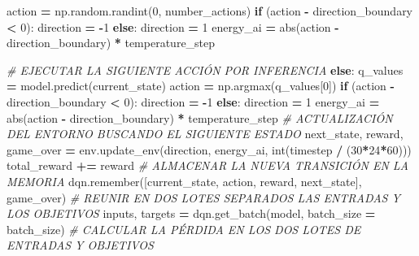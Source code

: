 \documentclass[
]{book}
\newenvironment{Shaded}{\begin{snugshade}}{\end{snugshade}}
\newcommand{\BuiltInTok}[1]{#1}
\newcommand{\CommentTok}[1]{\textcolor[rgb]{0.56,0.35,0.01}{\textit{#1}}}
\newcommand{\ControlFlowTok}[1]{\textcolor[rgb]{0.13,0.29,0.53}{\textbf{#1}}}
\newcommand{\DecValTok}[1]{\textcolor[rgb]{0.00,0.00,0.81}{#1}}
\newcommand{\NormalTok}[1]{#1}
\newcommand{\OperatorTok}[1]{\textcolor[rgb]{0.81,0.36,0.00}{\textbf{#1}}}
\begin{document}
\begin{Shaded}
\begin{Highlighting}[]
\NormalTok{                action }\OperatorTok{=}\NormalTok{ np.random.randint(}\DecValTok{0}\NormalTok{, number\_actions)}
                \ControlFlowTok{if}\NormalTok{ (action }\OperatorTok{{-}}\NormalTok{ direction\_boundary }\OperatorTok{\textless{}} \DecValTok{0}\NormalTok{):}
\NormalTok{                    direction }\OperatorTok{=} \OperatorTok{{-}}\DecValTok{1}
                \ControlFlowTok{else}\NormalTok{:}
\NormalTok{                    direction }\OperatorTok{=} \DecValTok{1}
\NormalTok{                energy\_ai }\OperatorTok{=} \BuiltInTok{abs}\NormalTok{(action }\OperatorTok{{-}}\NormalTok{ direction\_boundary) }\OperatorTok{*}\NormalTok{ temperature\_step}
            
            \CommentTok{\# EJECUTAR LA SIGUIENTE ACCIÓN POR INFERENCIA}
            \ControlFlowTok{else}\NormalTok{:}
\NormalTok{                q\_values }\OperatorTok{=}\NormalTok{ model.predict(current\_state)}
\NormalTok{                action }\OperatorTok{=}\NormalTok{ np.argmax(q\_values[}\DecValTok{0}\NormalTok{])}
                \ControlFlowTok{if}\NormalTok{ (action }\OperatorTok{{-}}\NormalTok{ direction\_boundary }\OperatorTok{\textless{}} \DecValTok{0}\NormalTok{):}
\NormalTok{                    direction }\OperatorTok{=} \OperatorTok{{-}}\DecValTok{1}
                \ControlFlowTok{else}\NormalTok{:}
\NormalTok{                    direction }\OperatorTok{=} \DecValTok{1}
\NormalTok{                energy\_ai }\OperatorTok{=} \BuiltInTok{abs}\NormalTok{(action }\OperatorTok{{-}}\NormalTok{ direction\_boundary) }\OperatorTok{*}\NormalTok{ temperature\_step}
            \CommentTok{\# ACTUALIZACIÓN DEL ENTORNO BUSCANDO EL SIGUIENTE ESTADO}
\NormalTok{            next\_state, reward, game\_over }\OperatorTok{=} 
\NormalTok{                                  env.update\_env(direction, energy\_ai,}
                                                 \BuiltInTok{int}\NormalTok{(timestep }\OperatorTok{/}\NormalTok{ (}\DecValTok{30}\OperatorTok{*}\DecValTok{24}\OperatorTok{*}\DecValTok{60}\NormalTok{)))}
\NormalTok{            total\_reward }\OperatorTok{+=}\NormalTok{ reward}
            \CommentTok{\# ALMACENAR LA NUEVA TRANSICIÓN EN LA MEMORIA}
\NormalTok{            dqn.remember([current\_state, action, reward, next\_state], game\_over)}
            \CommentTok{\# REUNIR EN DOS LOTES SEPARADOS LAS ENTRADAS Y LOS OBJETIVOS}
\NormalTok{            inputs, targets }\OperatorTok{=}\NormalTok{ dqn.get\_batch(model, batch\_size }\OperatorTok{=}\NormalTok{ batch\_size)}
            \CommentTok{\# CALCULAR LA PÉRDIDA EN LOS DOS LOTES DE ENTRADAS Y OBJETIVOS}

\end{Highlighting}
\end{Shaded}
\end{document}
